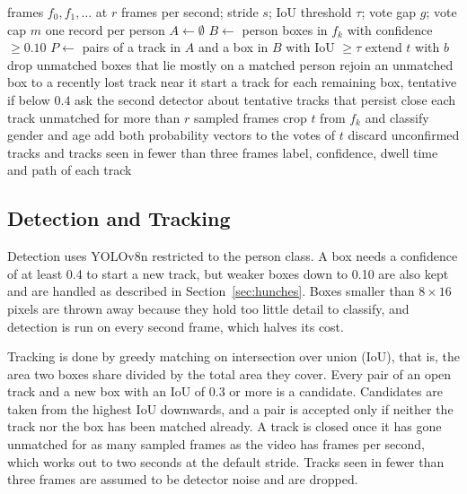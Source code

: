 \documentclass[conference]{IEEEtran}
\begin{document}
\begin{algorithm}[t]
\caption{Processing one video}
\label{alg:pipeline}
\begin{algorithmic}[1]
\Require frames $f_0, f_1, \dots$ at $r$ frames per second; stride $s$; IoU threshold $\tau$; vote gap $g$; vote cap $m$
\Ensure one record per person
\State $A \gets \emptyset$ 
  \State $B \gets$ person boxes in $f_k$ with confidence $\geq 0.10$
  \State $P \gets$ pairs of a track in $A$ and a box in $B$ with IoU $\geq \tau$
      \State extend $t$ with $b$
    \EndIf
  \EndFor
  \State drop unmatched boxes that lie mostly on a matched person
  \State rejoin an unmatched box to a recently lost track near it
  \State start a track for each remaining box, tentative if below $0.4$
  \State ask the second detector about tentative tracks that persist
  \State close each track unmatched for more than $r$ sampled frames
      \State crop $t$ from $f_k$ and classify gender and age
      \State add both probability vectors to the votes of $t$
    \EndIf
  \EndFor
\EndFor
\State discard unconfirmed tracks and tracks seen in fewer than three frames
\State \Return label, confidence, dwell time and path of each track
\end{algorithmic}
\end{algorithm}

\subsection{Detection and Tracking}
\label{sec:tracking}
Detection uses YOLOv8n restricted to the person class. A box needs a confidence of
at least 0.4 to start a new track, but weaker boxes down to 0.10 are also kept and
are handled as described in Section~\ref{sec:hunches}. Boxes smaller than
$8\times16$ pixels are thrown away because they hold too little detail to
classify, and detection is run on every second frame, which halves its cost.

Tracking is done by greedy matching on intersection over union (IoU), that is, the
area two boxes share divided by the total area they cover. Every pair of an open
track and a new box with an IoU of 0.3 or more is a candidate. Candidates are
taken from the highest IoU downwards, and a pair is accepted only if neither the
track nor the box has been matched already. A track is closed once it has gone
unmatched for as many sampled frames as the video has frames per second, which
works out to two seconds at the default stride. Tracks seen in fewer than three
frames are assumed to be detector noise and are dropped.
\end{document}
